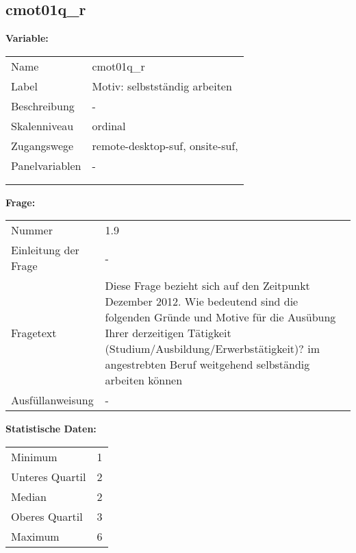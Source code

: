 	
	
	\subsection{cmot01q\_r}
	\label{subSection:cmot01q_r}

	\noindent\textbf{Variable:}\\
		\begin{tabular}{lL{11.3cm}}
			\label{tableVariable:cmot01q_r}
			Name & cmot01q\_r \\
			Label & Motiv: selbstständig arbeiten \\
			Beschreibung & - \\
			Skalenniveau & ordinal \\
			Zugangswege &
				remote-desktop-suf,
				onsite-suf,
 \\
			Panelvariablen & -
			 \\
			 \\
 \\
		\end{tabular}

		\vspace*{1 cm}
		\noindent\textbf{Frage:}\\
		\begin{tabular}{lL{11.3cm}}
			\label{tableQuestion:cmot01q_r}
			Nummer & 1.9 \\
			Einleitung der Frage & - \\
			Fragetext & Diese Frage bezieht sich auf den Zeitpunkt Dezember 2012. Wie bedeutend sind die folgenden Gründe und Motive für die Ausübung Ihrer derzeitigen Tätigkeit (Studium/Ausbildung/Erwerbstätigkeit)?
im angestrebten Beruf weitgehend selbständig arbeiten können \\
			Ausfüllanweisung & - \\
		\end{tabular}


		\vspace*{1 cm}
		\noindent\textbf{Statistische Daten:}\\
			\begin{tabular}{ll}
				\label{tableStatistics:cmot01q_r}
					Minimum & 1 \\
					Unteres Quartil & 2 \\
					Median & 2 \\
					Oberes Quartil & 3 \\
					Maximum & 6 \\
			\end{tabular}



